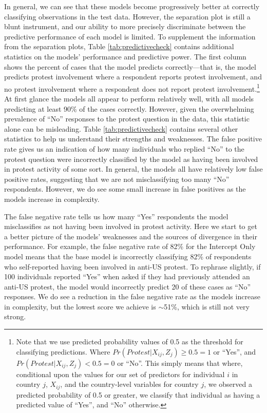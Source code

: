 In general, we can see that these models become progressively better at correctly classifying observations in the test data. However, the separation plot is still a blunt instrument, and our ability to more precisely discriminate between the predictive performance of each model is limited. To supplement the information from the separation plots, Table \ref{tab:predictivecheck} contains additional statistics on the models' performance and predictive power. The first column shows the percent of cases that the model predicts correctly---that is, the model predicts protest involvement where a respondent reports protest involvement, and no protest involvement where a respondent does not report protest involvement.\footnote{Note that we use predicted probability values of 0.5 as the threshold for classifying predictions. Where $Pr(Protest | X_{ij}, Z_j) \geq 0.5 = 1$ or ``Yes'', and $Pr(Protest | X_{ij}, Z_j) < 0.5 = 0$ or ``No''. This simply means that where, conditional upon the values for our set of predictors for individual $i$ in country $j$, $X_{ij}$, and the country-level variables for country $j$, we observed a predicted probability of 0.5 or greater, we classify that individual as having a predicted value of ``Yes'', and ``No'' otherwise.} At first glance the models all appear to perform relatively well, with all models predicting at least 90\% of the cases correctly. However, given the overwhelming prevalence of ``No'' responses to the protest question in the data, this statistic alone can be misleading. Table \ref{tab:predictivecheck} contains several other statistics to help us understand their strengths and weaknesses. The false positive rate gives us an indication of how many individuals who replied ``No'' to the protest question were incorrectly classified by the model as having been involved in protest activity of some sort. In general, the models all have relatively low false positive rates, suggesting that we are not misclassifying too many ``No'' respondents. However, we do see some small increase in false positives as the models increase in complexity.

The false negative rate tells us how many ``Yes'' respondents the model misclassifies as not having been involved in protest activity. Here we start to get a better picture of the models' weaknesses and the sources of divergence in their performance. For example, the false negative rate of 82\% for the Intercept Only model means that the base model is incorrectly classifying 82\% of respondents who self-reported having been involved in anti-US protest. To rephrase slightly, if 100 individuals reported ``Yes'' when asked if they had previously attended an anti-US protest, the model would incorrectly predict 20 of these cases as ``No'' responses. We do see a reduction in the false negative rate as the models increase in complexity, but the lowest score we achieve is $\sim$51\%, which is still not very strong.

